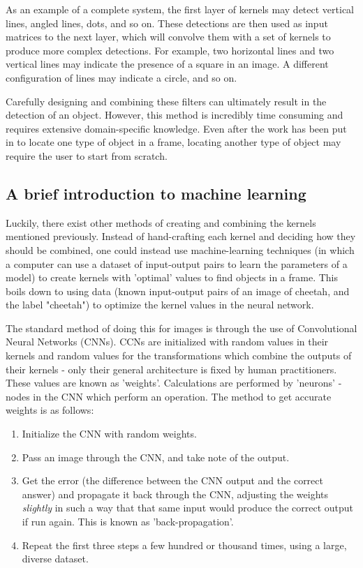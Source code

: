As an example of a complete system, the first layer of kernels may detect vertical lines, angled lines, dots, and so on. These detections are then used as input matrices to the next layer, which will convolve them with a set of kernels to produce more complex detections. For example, two horizontal lines and two vertical lines may indicate the presence of a square in an image. A different configuration of lines may indicate a circle, and so on.

Carefully designing and combining these filters can ultimately result in the detection of an object. However, this method is incredibly time consuming and requires extensive domain-specific knowledge. Even after the work has been put in to locate one type of object in a frame, locating another type of object may require the user to start from scratch.

\subsection{A brief introduction to machine learning}

Luckily, there exist other methods of creating and combining the kernels mentioned previously. Instead of hand-crafting each kernel and deciding how they should be combined, one could instead use machine-learning techniques (in which a computer can use a dataset of input-output pairs to learn the parameters of a model) to create kernels with 'optimal' values to find objects in a frame. This boils down to using data (known input-output pairs of an image of cheetah, and the label "cheetah") to optimize the kernel values in the neural network.

The standard method of doing this for images is through the use of Convolutional Neural Networks (CNNs). CCNs are initialized with random values in their kernels and random values for the transformations which combine the outputs of their kernels - only their general architecture is fixed by human practitioners. These values are known as 'weights'. Calculations are performed by 'neurons' - nodes in the CNN which perform an operation. The method to get accurate weights is as follows:

\begin{enumerate}
\item Initialize the CNN with random weights.
\item Pass an image through the CNN, and take note of the output.
\item Get the error (the difference between the CNN output and the correct answer) and propagate it back through the CNN, adjusting the weights \emph{slightly} in such a way that that same input would produce the correct output if run again. This is known as 'back-propagation'.
\item Repeat the first three steps a few hundred or thousand times, using a large, diverse dataset.
\end{enumerate}

